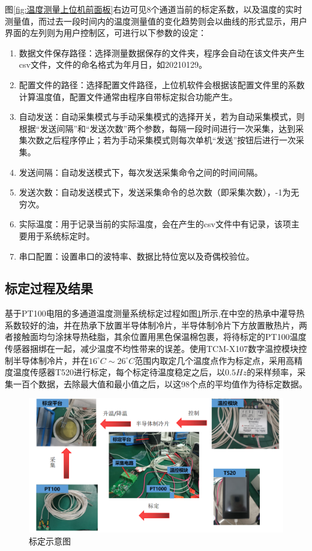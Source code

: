 图\ref{fig:温度测量上位机前面板}右边可见8个通道当前的标定系数，以及温度的实时测量值，而过去一段时间内的温度测量值的变化趋势则会以曲线的形式显示，用户界面的左列则为用户控制区，可进行以下参数的设定：
\begin{enumerate}
    \item 数据文件保存路径：选择测量数据保存的文件夹，程序会自动在该文件夹产生csv文件，文件的命名格式为年月日，如20210129。
    \item 配置文件的路径：选择配置文件路径，上位机软件会根据该配置文件里的系数计算温度值，配置文件通常由程序自带标定拟合功能产生。
    \item 自动发送：自动采集模式与手动采集模式的选择开关，若为自动采集模式，则根据“发送间隔”和“发送次数”两个参数，每隔一段时间进行一次采集，达到采集次数之后程序停止；若为手动采集模式则每次单机“发送”按钮后进行一次采集。
    \item 发送间隔：自动发送模式下，每次发送采集命令之间的时间间隔。
    \item 发送次数：自动发送模式下，发送采集命令的总次数（即采集次数），-1为无穷次。
    \item 实际温度：用于记录当前的实际温度，会在产生的csv文件中有记录，该项主要用于系统标定时。
    \item 串口配置：设置串口的波特率、数据比特位宽以及奇偶校验位。
  \end{enumerate}

  \subsection{标定过程及结果}
  基于PT100电阻的多通道温度测量系统标定过程如图\ref{fig:标定示意图}所示,在中空的热承中灌导热系数较好的油，并在热承下放置半导体制冷片，半导体制冷片下方放置散热片，两者接触面均匀涂抹导热硅脂，其余位置用黑色保温棉包裹，将待标定的PT100温度传感器捆绑在一起，减少温度不均性带来的误差。使用TCM-X107数字温控模块控制半导体制冷片，并在\(16^{\circ}C \sim 26^{\circ}C\)范围内取定几个温度点作为标定点，采用高精度温度传感器T520进行标定，每个标定待温度稳定之后，以\(0.5Hz\)的采样频率，采集一百个数据，去除最大值和最小值之后，以这98个点的平均值作为待标定数据。
  \begin{figure}[htb]
    \centering
    \includegraphics[width=12cm]{fig/3-fig/温度测量系统标定示意图.jpg}
    \caption{标定示意图}
    \label{fig:标定示意图}
\end{figure}

